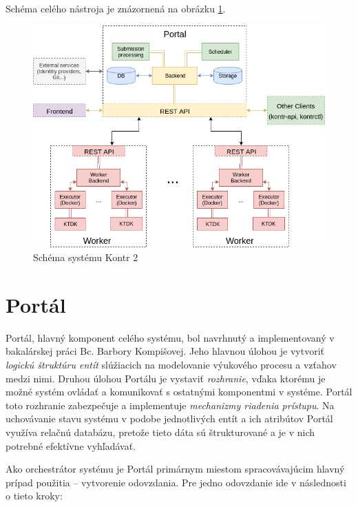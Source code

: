 \documentclass[
  digital, %
  oneside, %
  table,   %
  lof,     %
  lot,   %
]{fithesis3}
\begin{document}
Schéma celého nástroja je znázornená na obrázku \ref{fig:kontr2}.
\clearpage
\begin{figure}[!ht]
  \begin{center}
    \includegraphics[width=\textwidth]{imgs/system-full.png}
  \end{center}
    \caption{Schéma systému Kontr 2}
    \label{fig:kontr2}
\end{figure}

\section{Portál}

Portál, hlavný komponent celého systému, bol navrhnutý a implementovaný v bakalárskej práci Bc. Barbory Kompišovej\cite{kontr-portal}. Jeho hlavnou úlohou je vytvoriť \emph{logickú štruktúru entít} slúžiacich na modelovanie výukového procesu a vzťahov medzi nimi. Druhou úlohou Portálu je vystaviť \emph{rozhranie}, vďaka ktorému je možné systém ovládať a komunikovať s ostatnými komponentmi v systéme. Portál toto rozhranie zabezpečuje a implementuje \emph{mechanizmy riadenia prístupu}\cite{RFC4949}. Na uchovávanie stavu systému v podobe jednotlivých entít a ich atribútov Portál využíva relačnú databázu, pretože tieto dáta sú štrukturované a je v nich potrebné efektívne vyhľadávať.

Ako orchestrátor systému je Portál primárnym miestom spracovávajúcim hlavný prípad použitia -- vytvorenie odovzdania. Pre jedno odovzdanie ide v následnosti o tieto kroky: 
\end{document}

